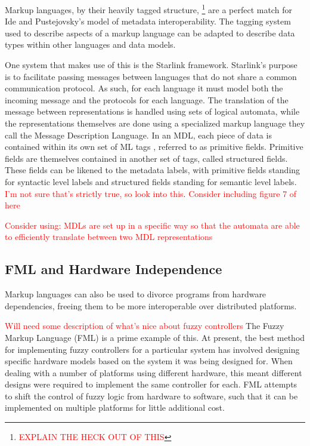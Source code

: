 \documentclass{sig-alternate}
\newcommand{\mycomment}[1]{\textcolor{red}{#1}}
\begin{document}
Markup languages, by their heavily tagged structure, \footnote{\mycomment{EXPLAIN THE HECK OUT OF THIS}} are a perfect match for Ide and Pustejovsky's model of metadata interoperability.\cite{Ide:2010} The tagging system used to describe aspects of a markup language can be adapted to describe data types within other languages and data models.

One system that makes use of this is the Starlink framework\cite{Bromberg:2011}. Starlink's purpose is to facilitate passing messages between languages that do not share a common communication protocol. As such, for each language it must model both the incoming message and the protocols for each language.
The translation of the message between representations is handled using sets of logical automata, while the representations themselves are done using a specialized markup language they call the Message Description Language. In an MDL, each piece of data is contained within its own set of ML tags , referred to as primitive fields. Primitive fields are themselves contained in another set of tags, called structured fields. These fields can be likened to the metadata labels, with primitive fields standing for syntactic level labels and structured fields standing for semantic level labels. \mycomment{I'm not sure that's strictly true, so look into this}.
\mycomment{Consider including figure 7 of \cite{Bromberg:2011} here}

\mycomment{Consider using: MDLs are set up in a specific way so that the automata are able to efficiently translate between two MDL representations}


\subsection*{FML and Hardware Independence}

Markup languages can also be used to divorce programs from hardware dependencies, freeing them to be more interoperable over distributed platforms.

\mycomment{Will need some description of what's nice about fuzzy controllers}
The Fuzzy Markup Language (FML) is a prime example of this. At present, the best method for implementing fuzzy controllers for a particular system has involved designing specific hardware models based on the system it was being designed for. When dealing with a number of platforms using different hardware, this meant different designs were required to implement the same controller for each. FML attempts to shift the control of fuzzy logic from hardware to software, such that it can be implemented on multiple platforms for little additional cost.
\end{document}
